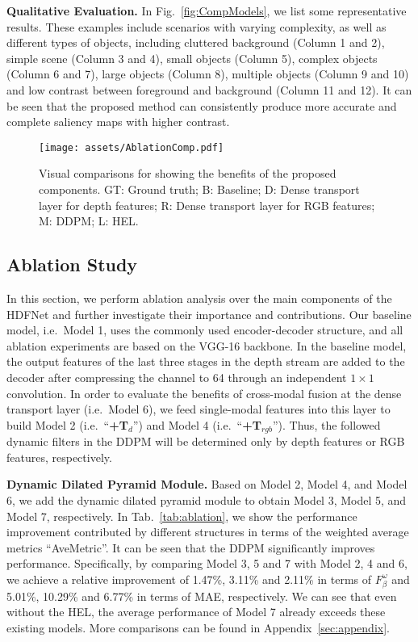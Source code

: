 \documentclass[runningheads]{llncs}
\begin{document}
\noindent\textbf{Qualitative Evaluation.}
In Fig.~\ref{fig:CompModels}, we list some representative results. These examples include scenarios with varying complexity, as well as different types of objects, including cluttered background (Column 1 and 2), simple scene (Column 3 and 4), small objects (Column 5), complex objects (Column 6 and 7), large objects (Column 8), multiple objects (Column 9 and 10) and low contrast between foreground and background (Column 11 and 12).
It can be seen that the proposed method can consistently produce more accurate and complete saliency maps with higher contrast.

\begin{figure}[t]
 \begin{center}
  \texttt{[image: assets/AblationComp.pdf]}
  \caption{Visual comparisons for showing the benefits of the proposed components. GT: Ground truth; B: Baseline; D: Dense transport layer for depth features; R: Dense transport layer for RGB features; M: DDPM; L: HEL.}
  \label{fig:AblationComp}
 \end{center}
\end{figure}

\subsection{Ablation Study}

In this section, we perform ablation analysis over the main components of the HDFNet and further investigate their importance and contributions. Our baseline model, i.e.\ Model 1, uses the commonly used encoder-decoder structure, and all ablation experiments are based on the VGG-16 backbone. In the baseline model, the output features of the last three stages in the depth stream are added to the decoder after compressing the channel to 64 through an independent $1 \times 1$ convolution.
In order to evaluate the benefits of cross-modal fusion at the dense transport layer (i.e.\ Model 6), we feed single-modal features into this layer to build Model 2 (i.e.\ ``\textbf{+T$_{d}$}'') and Model 4 (i.e.\ ``\textbf{+T$_{rgb}$}''). Thus, the followed dynamic filters in the DDPM will be determined only by depth features or RGB features,  respectively.

\noindent\textbf{Dynamic Dilated Pyramid Module.}
Based on Model 2, Model 4, and Model 6, we add the dynamic dilated pyramid module to obtain Model 3, Model 5, and Model 7, respectively.
In Tab.~\ref{tab:ablation}, we show the performance improvement contributed by different structures in terms of the weighted average metrics ``AveMetric''.
It can be seen that the DDPM significantly improves performance.
Specifically, by comparing Model 3, 5 and 7 with Model 2, 4 and 6,  we achieve a relative improvement of 1.47\%, 3.11\% and 2.11\% in terms of $F^{\omega}_{\beta}$ and 5.01\%, 10.29\% and 6.77\% in terms of MAE, respectively.
We can see that even without the HEL, the average performance of Model 7 already exceeds these existing models.
More comparisons can be found in Appendix~\ref{sec:appendix}.
\end{document}
